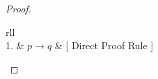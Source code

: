 \begin{proof} \hfill\par
    \begin{tabular}{rll}
         \\
        1. & \( p \to q \) & [ Direct Proof Rule ] \\
    \end{tabular} \par
\end{proof}

